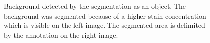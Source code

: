 \begin{figure}
	\center	
	\caption{Background detected by the segmentation as an object. The background was segmented because of a higher stain concentration which is visible on the left image. The segmented area is delimited by the annotation on the right image.}
	\label{fig:first_seg_example_high_stain}
\end{figure}
